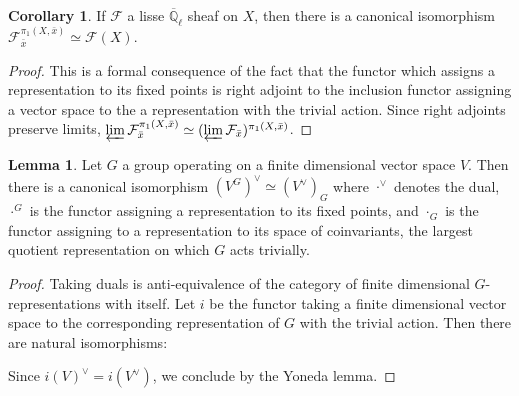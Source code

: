 \documentclass{ucbthesis}
\theoremstyle{definition}
\theoremstyle{theorem}
\newtheorem{lem}[thm]{Lemma}
\newtheorem{cor}[thm]{Corollary}
\begin{document}
\begin{cor}
If $\mathcal{F}$ a lisse $\overline{\mathbb{Q}}_{\ell}$ sheaf on $X$, then there is a canonical isomorphism $\mathcal{F}_{\bar{x}}^{\pi_{1}(X,\bar{x})}\simeq \mathcal{F}(X)$. 
\end{cor}

\begin{proof}
This is a formal consequence of the fact that the functor which assigns a representation to its fixed points is right adjoint to the inclusion functor assigning a vector space to the a representation with the trivial action. Since right adjoints preserve limits, $\varprojlim \mathcal{F}_{\bar{x}}^{\pi_{1}(X,\bar{x})} \simeq (\varprojlim \mathcal{F}_{\bar{x}})^{\pi_{1}(X,\bar{x})}$. 
\end{proof}

\begin{lem}
Let $G$ a group operating on a finite dimensional vector space $V$. Then there is a canonical isomorphism $(V^{G})^{\vee}\simeq (V^{\vee})_{G}$ where $\cdot^{\vee}$ denotes the dual, $\cdot^{G}$ is the functor assigning a representation to its fixed points, and $\cdot_{G}$ is the functor assigning to a representation to its space of coinvariants, the largest quotient representation on which $G$ acts trivially. 
\end{lem}

\begin{proof}
Taking duals is anti-equivalence of the category of finite dimensional $G$-representations with itself. Let $i$ be the functor taking a finite dimensional vector space to the corresponding representation of $G$ with the trivial action. Then there are natural isomorphisms:

\begin{center}
\end{center}

Since $i(V)^{\vee} = i(V^{\vee})$, we conclude by the Yoneda lemma. 
\end{proof}
\end{document}
